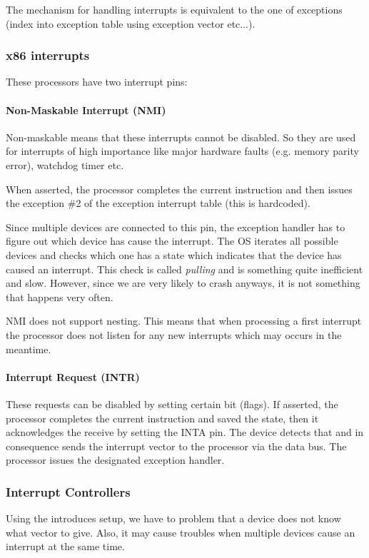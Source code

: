 The mechanism for handling interrupts is equivalent to the one of exceptions (index into exception table using exception vector etc...).

\subsubsection{x86 interrupts}
These processors have two interrupt pins:

\paragraph{Non-Maskable Interrupt (NMI)}
Non-maskable means that these interrupts cannot be disabled. So they are used for interrupts of high importance like major hardware faults (e.g. memory parity error), watchdog timer etc.

When asserted, the processor completes the current instruction and then issues the exception \#2 of the exception interrupt table (this is hardcoded).

Since multiple devices are connected to this pin, the exception handler has to figure out which device has cause the interrupt. The OS iterates all possible devices and checks which one has a state which indicates that the device has caused an interrupt. This check is called \textit{pulling} and is something quite inefficient and slow. However, since we are very likely to crash anyways, it is not something that happens very often.

NMI does not support nesting. This means that when processing a first interrupt the processor does not listen for any new interrupts which may occurs in the meantime. 

\paragraph{Interrupt Request (INTR)}
These requests can be disabled by setting certain bit (flags). If asserted, the processor completes the current instruction and saved the state, then it acknowledges the receive by setting the INTA pin. The device detects that and in consequence sends the interrupt vector to the processor via the data bus. The processor issues the designated exception handler. 

\subsubsection{Interrupt Controllers}
Using the introduces setup, we have to problem that a device does not know what vector to give. Also, it may cause troubles when multiple devices cause an interrupt at the same time.

